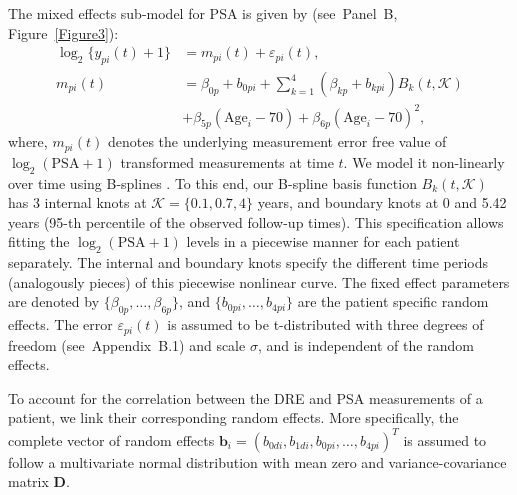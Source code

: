 \documentclass[Afour,sagev,times]{sagej}
\begin{document}
The mixed effects sub-model for PSA is given by (see~Panel~B, Figure~\ref{Figure3}):
\begin{equation}
\label{eq:long_model_psa}
\begin{split}
    \log_2 \big\{y_{pi}(t) + 1\big\} &= m_{pi}(t) + \varepsilon_{pi}(t),\\
    m_{pi}(t) &= \beta_{0p} + b_{0pi} + \sum_{k=1}^4 (\beta_{kp} + b_{kpi})  B_k(t,\mathcal{K})\\ 
    &+ \beta_{5p} (\mbox{Age}_i-70) + \beta_{6p} (\mbox{Age}_i-70)^2,
    \end{split}
\end{equation}
where, $m_{pi}(t)$ denotes the underlying measurement error free value of $\log_2 (\mbox{PSA} + 1)$ transformed \citep{pearson1994mixed,lin2000latent} measurements at time $t$. We model it non-linearly over time using B-splines \citep{de1978practical}. To this end, our B-spline basis function $B_k(t, \mathcal{K})$ has 3 internal knots at $\mathcal{K} = \{0.1, 0.7, 4\}$ years, and boundary knots at 0 and 5.42 years (95-th percentile of the observed follow-up times). This specification allows fitting the $\log_2 (\mbox{PSA} + 1)$ levels in a piecewise manner for each patient separately. The internal and boundary knots specify the different time periods (analogously pieces) of this piecewise nonlinear curve. The fixed effect parameters are denoted by ${\{\beta_{0p},\ldots,\beta_{6p}\}}$, and ${\{b_{0pi}, \ldots, b_{4pi}\}}$ are the patient specific random effects. The error $\varepsilon_{pi}(t)$ is assumed to be t-distributed with three degrees of freedom (see~Appendix~B.1) and scale $\sigma$, and is independent of the random effects. 

To account for the correlation between the DRE and PSA measurements of a patient, we link their corresponding random effects. More specifically, the complete vector of random effects ${\boldsymbol{b}_i = (b_{0di}, b_{1di}, b_{0pi}, \ldots, b_{4pi})^T}$ is assumed to follow a multivariate normal distribution with mean zero and variance-covariance matrix $\boldsymbol{D}$.
\end{document}
